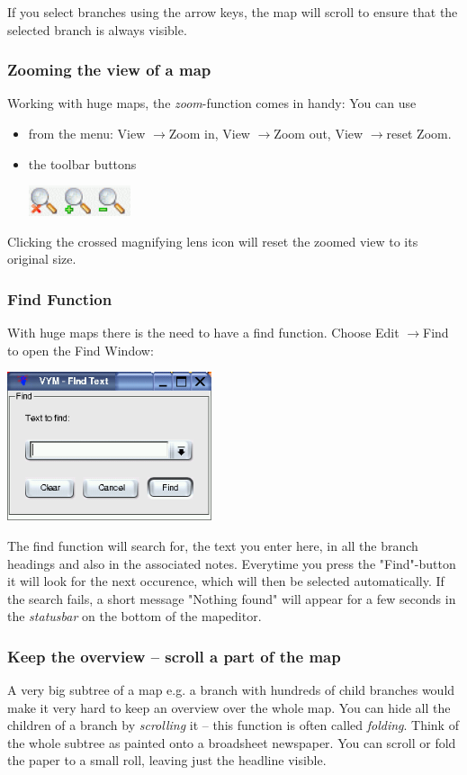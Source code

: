 \documentclass[12pt,a4paper]{article}
\newcommand{\ra}{$\longrightarrow$}
\begin{document}
If you select branches using the arrow keys, the map will scroll
to ensure that the selected branch is always visible.

\subsubsection*{Zooming the view of a map}
Working with huge maps, the {\em zoom}-function comes in handy: You can
use 
\begin{itemize}
    \item from the menu: View \ra Zoom in, View \ra Zoom out, View \ra reset Zoom.
    \item the toolbar buttons 
        \begin{center}
            \includegraphics[width=3cm]{images/zoom-buttons.png}
        \end{center}    
\end{itemize}   
Clicking the crossed magnifying lens icon will reset the zoomed view to its original size.


\subsubsection*{Find Function} \label{findwindow}
With huge maps there is the need to have a
find function. Choose Edit \ra Find to open the Find Window:
\begin{center}
    \includegraphics[width=6cm]{images/find-window.png}
\end{center}    
The find function will search for, the text you enter here, in all the branch headings and also in the associated notes. Everytime you press the "Find"-button it will look for the next occurence, which will then be selected automatically. If the search
fails, a short message "Nothing found" will appear for a few
seconds in the {\em statusbar} on the bottom of the mapeditor.

\subsubsection*{Keep the overview -- scroll a part of the map}
A very big subtree of a map e.g. a branch with hundreds of child branches would make
it very hard to keep an overview over the whole map. You can hide all
the children of a branch by {\em scrolling} it -- this function is often called {\em folding}. Think of the whole subtree as painted onto a
broadsheet newspaper. You can scroll or fold the paper to a small roll, leaving just
the headline visible.
\end{document}
